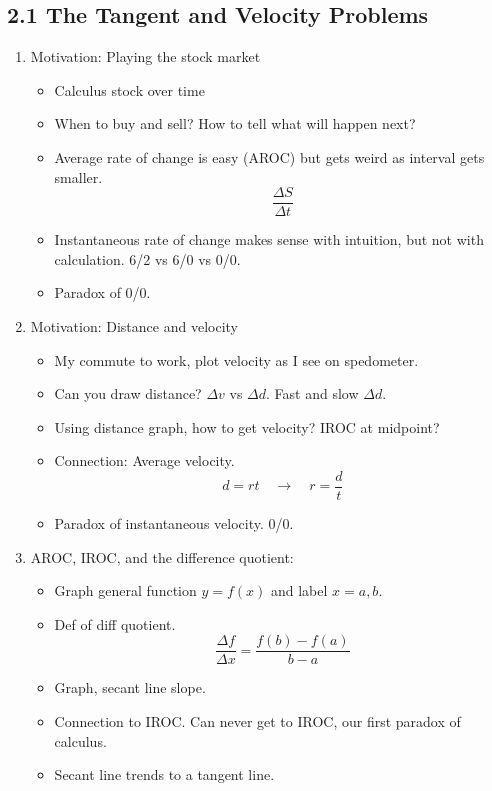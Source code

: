 \documentclass{article}
\begin{document}
\subsection{2.1 The Tangent and Velocity Problems}
\begin{enumerate}
\item Motivation: Playing the stock market
\begin{itemize}
\item Calculus stock over time
\item When to buy and sell? How to tell what will happen next?
\item Average rate of change is easy (AROC) but gets weird as interval gets smaller.
\[
\frac{\Delta S}{\Delta t}
\]
\item Instantaneous rate of change makes sense with intuition, but not with calculation. 6/2 vs 6/0 vs 0/0.
\item Paradox of 0/0.
\end{itemize}


\item Motivation: Distance and velocity
\begin{itemize}
\item My commute to work, plot velocity as I see on spedometer.
\item Can you draw distance? $\Delta v$ vs $\Delta d$. Fast and slow $\Delta d$. 
\item Using distance graph, how to get velocity? IROC at midpoint?
\item Connection: Average velocity.
\[
d = rt \quad \rightarrow \quad r = \frac{d}{t}
\]
\item Paradox of instantaneous velocity. 0/0. 
\end{itemize}


\item AROC, IROC, and the difference quotient:
\begin{itemize}
\item Graph general function $y=f(x)$ and label $x=a,b$. 
\item Def of diff quotient.
\[
\frac{\Delta f}{\Delta x} = \frac{f(b)-f(a)}{b-a}
\]
\item Graph, secant line slope.
\item Connection to IROC. Can never get to IROC, our first paradox of calculus. 
\item Secant line trends to a tangent line.
\end{itemize}



\end{enumerate}
\end{document}

